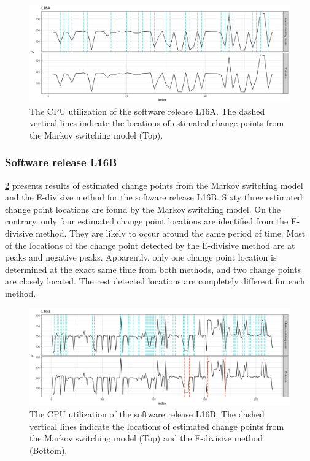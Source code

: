 \begin{figure}[H]
\begin{centering}
\includegraphics[scale=0.35]{picture/compare_L16A}
\par\end{centering}
\caption{The CPU utilization of the software release L16A. The dashed vertical
lines indicate the locations of estimated change points from the Markov
switching model (Top). }

\label{compare_L16A}
\end{figure}


\subsubsection{Software release L16B}

\ref{compare_L16B} presents results of estimated change points from
the Markov switching model and the E-divisive method for the software
release L16B. Sixty three estimated change point locations are found
by the Markov switching model. On the contrary, only four estimated
change point locations are identified from the E-divisive method.
They are likely to occur around the same period of time. Most of the
locations of the change point detected by the E-divisive method are
at peaks and negative peaks. Apparently, only one change point location
is determined at the exact same time from both methods, and two change
points are closely located. The rest detected locations are completely
different for each method.

\begin{figure}[H]
\begin{centering}
\includegraphics[scale=0.35]{picture/compare_L16B}
\par\end{centering}
\caption{The CPU utilization of the software release L16B. The dashed vertical
lines indicate the locations of estimated change points from the Markov
switching model (Top) and the E-divisive method (Bottom). }

\label{compare_L16B}
\end{figure}


